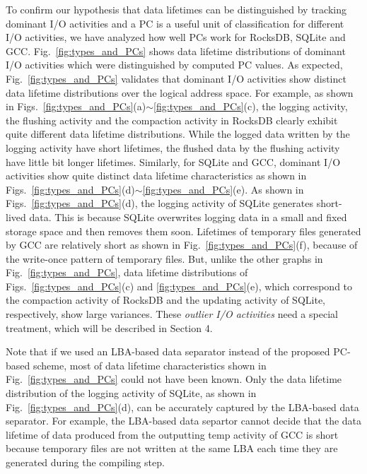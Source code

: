 To confirm our hypothesis that data lifetimes can be distinguished by tracking
dominant I/O activities and a PC is a useful unit of classification for
different I/O activities, we have analyzed how well PCs work for RocksDB,
SQLite and GCC.  Fig.~\ref{fig:types_and_PCs} shows data lifetime distributions
of dominant I/O activities which were distinguished by computed PC values.  As
expected, Fig.~\ref{fig:types_and_PCs} validates that dominant I/O activities
show distinct data lifetime distributions over the logical address space.  For
example, as shown in
Figs.~\ref{fig:types_and_PCs}(a)$\sim$\ref{fig:types_and_PCs}(c), the logging
activity, the flushing activity and the compaction activity in RocksDB clearly
exhibit quite different data lifetime distributions.  While the logged data
written by the logging activity have short lifetimes, the flushed data by the
flushing activity have little bit longer lifetimes.  Similarly, for SQLite and
GCC, dominant I/O activities show quite distinct data lifetime characteristics
as shown in Figs.~\ref{fig:types_and_PCs}(d)$\sim$\ref{fig:types_and_PCs}(e).
As shown in Figs.~\ref{fig:types_and_PCs}(d), the logging activity of SQLite
generates short-lived data.  This is because SQLite overwrites logging data in
a small and fixed storage space and then removes them soon.  Lifetimes of
temporary files generated by GCC are relatively short as shown in
Fig.~\ref{fig:types_and_PCs}(f), because of the write-once pattern of temporary
files.  But, unlike the other graphs in Fig.~\ref{fig:types_and_PCs}, data
lifetime distributions of Figs.~\ref{fig:types_and_PCs}(c) and
\ref{fig:types_and_PCs}(e), which correspond to the compaction activity of
RocksDB and the updating activity of SQLite, respectively, show large
variances.  These {\it outlier I/O activities} need a special treatment, which
will be described in Section 4.

Note that if we used an LBA-based data separator instead of the proposed
PC-based scheme, most of data lifetime characteristics shown in
Fig.~\ref{fig:types_and_PCs} could not have been known.  Only the data lifetime
distribution of the logging activity of SQLite, as shown in
Fig.~\ref{fig:types_and_PCs}(d), can be accurately captured by the LBA-based
data separator.  For example, the LBA-based data separtor cannot decide that
the data lifetime of data produced from the outputting temp activity of GCC is
short because temporary files are not written at the same LBA each time they
are generated during the compiling step. 


\vspace{-10pt}
